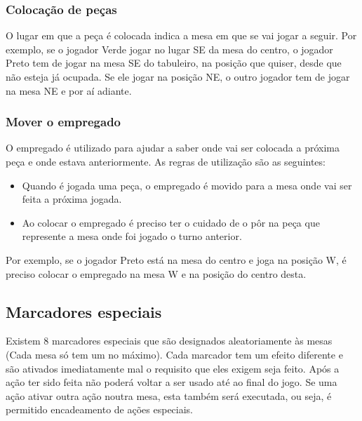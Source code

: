 \documentclass[a4paper]{article}
\begin{document}
\subsubsection{Colocação de peças}
O lugar em que a peça é colocada indica a mesa em que se vai jogar a seguir. Por exemplo, se o jogador Verde jogar no lugar SE da mesa do centro, o jogador Preto tem de jogar na mesa SE do tabuleiro, na posição que quiser, desde que não esteja já ocupada. Se ele jogar na posição NE, o outro jogador tem de jogar na mesa NE e por aí adiante.

\subsubsection{Mover o empregado}
O empregado é utilizado para ajudar a saber onde vai ser colocada a próxima peça e onde estava anteriormente. As regras de utilização são as seguintes:
\begin{itemize}
\item Quando é jogada uma peça, o empregado é movido para a mesa onde vai ser feita a próxima jogada.
\item Ao colocar o empregado é preciso ter o cuidado de o pôr na peça que represente a mesa onde foi jogado o turno anterior.
\end{itemize}
Por exemplo, se o jogador Preto está na mesa do centro e joga na posição W, é preciso colocar o empregado na mesa W e na posição do centro desta.

\subsection{Marcadores especiais}
Existem 8 marcadores especiais que são designados aleatoriamente às mesas (Cada mesa só tem um no máximo). Cada marcador tem um efeito diferente e são ativados imediatamente mal o requisito que eles exigem seja feito. Após a ação ter sido feita não poderá voltar a ser usado até ao final do jogo. Se uma ação ativar outra ação noutra mesa, esta também será executada, ou seja, é permitido encadeamento de ações especiais.
\end{document}
